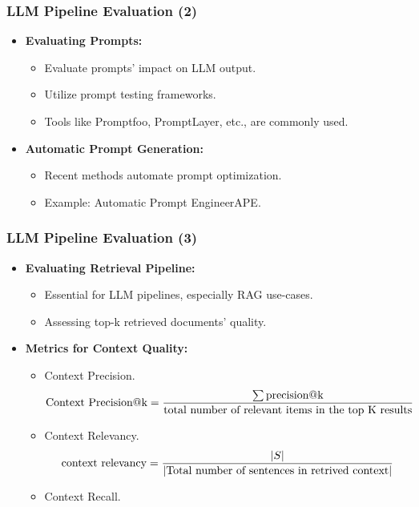 \begin{frame}[fragile]\frametitle{LLM Pipeline Evaluation (2)}
  \begin{itemize}
    \item \textbf{Evaluating Prompts:}
      \begin{itemize}
        \item Evaluate prompts' impact on LLM output.
        \item Utilize prompt testing frameworks.
        \item Tools like Promptfoo, PromptLayer, etc., are commonly used.
      \end{itemize}
    \item \textbf{Automatic Prompt Generation:}
      \begin{itemize}
        \item Recent methods automate prompt optimization.
        \item Example: Automatic Prompt EngineerAPE.
      \end{itemize}
  \end{itemize}
\end{frame}

\begin{frame}[fragile]\frametitle{LLM Pipeline Evaluation (3)}
  \begin{itemize}
    \item \textbf{Evaluating Retrieval Pipeline:}
      \begin{itemize}
        \item Essential for LLM pipelines, especially RAG use-cases.
        \item Assessing top-k retrieved documents' quality.
      \end{itemize}
    \item \textbf{Metrics for Context Quality:}
      \begin{itemize}
        \item Context Precision.
		$$\text{Context Precision@k} = {\sum {\text{precision@k}} \over \text{total number of relevant items in the top K results}}$$
        \item Context Relevancy. $$\text{context relevancy} = {|S| \over |\text{Total number of sentences in retrived context}|}$$
        \item Context Recall.
      \end{itemize}
  \end{itemize}

\end{frame}

